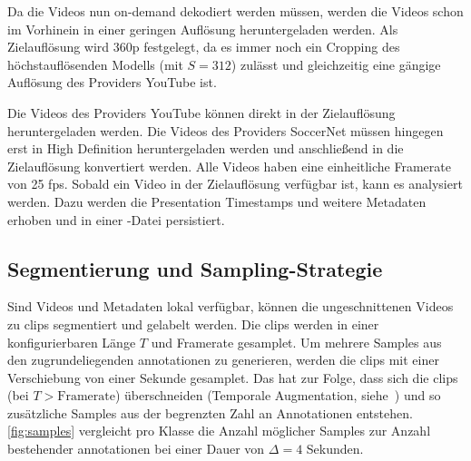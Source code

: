 Da die Videos nun on-demand dekodiert werden müssen, werden die Videos schon im Vorhinein in einer geringen Auflösung heruntergeladen werden.
Als Zielauflösung wird 360p festgelegt, da es immer noch ein Cropping des höchstauflösenden Modells (mit $S=312$) zulässt und gleichzeitig eine gängige Auflösung des Providers YouTube ist.

Die Videos des Providers YouTube können direkt in der Zielauflösung heruntergeladen werden.
Die Videos des Providers SoccerNet müssen hingegen erst in High Definition heruntergeladen werden und anschließend in die Zielauflösung konvertiert werden.
Alle Videos haben eine einheitliche Framerate von 25 \gls{fps}.
Sobald ein Video in der Zielauflösung verfügbar ist, kann es analysiert werden.
Dazu werden die Presentation Timestamps und weitere Metadaten erhoben und in einer -Datei persistiert.

\subsection{Segmentierung und Sampling-Strategie}
\label{subsec:segmentierung-und-sampling-strategie}

Sind Videos und Metadaten lokal verfügbar, können die ungeschnittenen Videos zu \glspl{clip} segmentiert und gelabelt werden.
Die \glspl{clip} werden in einer konfigurierbaren Länge $T$ und Framerate gesamplet.
Um mehrere Samples aus den zugrundeliegenden \gls{annotationen} zu generieren, werden die \glspl{clip} mit einer Verschiebung von einer Sekunde gesamplet.
Das hat zur Folge, dass sich die \glspl{clip} (bei $T > \text{Framerate}$) überschneiden (Temporale Augmentation, siehe~\cite{Giancola18}) und so zusätzliche Samples aus der begrenzten Zahl an Annotationen entstehen.
\autoref{fig:samples} vergleicht pro Klasse die Anzahl möglicher Samples zur Anzahl bestehender \gls{annotationen} bei einer Dauer von $\Delta=4$ Sekunden.

